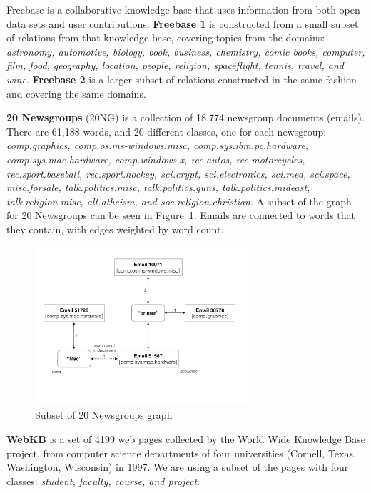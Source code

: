 \documentclass[12pt]{article}
\begin{document}
Freebase \cite{freebase:datadumps,talukdar2010experiments} is a collaborative knowledge base that uses information from both open data sets and user contributions.
\textbf{Freebase 1} is constructed from a small subset of relations from that knowledge base, covering topics from the domains: \textit{astronomy, automotive, biology, book, business, chemistry, comic books, computer, film, food, geography, location, people, religion, spaceflight, tennis, travel, \textnormal{and} wine}.
\textbf{Freebase 2} is a larger subset of relations constructed in the same fashion and covering the same domains.

\textbf{20 Newsgroups} (20NG) \cite{Lang95} is a collection of 18,774 newsgroup documents (emails).
There are 61,188 words, and 20 different classes, one for each newsgroup: \textit{comp.graphics, comp.os.ms-windows.misc, comp.sys.ibm.pc.hardware, comp.sys.mac.hardware, comp.windows.x, rec.autos, rec.motorcycles, rec.sport.baseball, rec.sport.hockey, sci.crypt, sci.electronics, sci.med, sci.space, misc.forsale, talk.politics.misc, talk.politics.guns, talk.politics.mideast, talk.religion.misc, alt.atheism, \textnormal{and} soc.religion.christian}.
A subset of the graph for 20 Newsgroups can be seen in Figure~\ref{fig:20ng}. Emails are connected to words that they contain, with edges weighted by word count.

\begin{figure}[H]
    \centering
    \includegraphics[width=0.7\textwidth]{figures/20ng.pdf}
    \caption{Subset of 20 Newsgroups graph\label{fig:20ng}}
\end{figure}

\textbf{WebKB} \cite{cachopo2007improving} is a set of 4199 web pages collected by the World Wide Knowledge Base project, from computer science departments of four universities (Cornell, Texas, Washington, Wisconsin) in 1997.
We are using a subset of the pages with four classes: \textit{student, faculty, course, \textnormal{and} project}.
\end{document}
